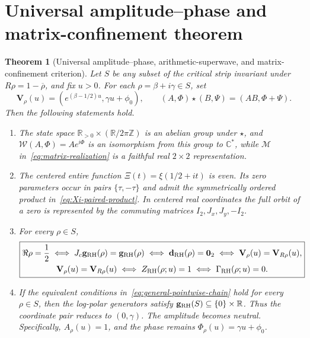 \documentclass[11pt]{article}
\newtheorem{theorem}[definition]{Theorem}
\newcommand{\vzero}{\mathbf 0}
\begin{document}
\section{Universal amplitude--phase and matrix-confinement theorem}
\begin{theorem}[Universal amplitude--phase, arithmetic-superwave, and matrix-confinement criterion]\label{thm:general-compass}
Let $S$ be any subset of the critical strip invariant under
$R\rho=1-\overline\rho$, and fix $u>0$.  For each $\rho=\beta+i\gamma\in S$, set
\begin{equation}
 \mathbf V_\rho(u)=\left(e^{(\beta-1/2)u},\gamma u+\phi_0\right),
 \qquad
 (A,\Phi)\star(B,\Psi)=(AB,\Phi+\Psi).
\end{equation}
Then the following statements hold.

\begin{enumerate}
 \item The state space
 $\mathbb R_{>0}\times(\mathbb R/2\pi\mathbb Z)$ is an abelian group under $\star$, and
 $\mathcal W(A,\Phi)=Ae^{i\Phi}$ is an isomorphism from this group to $\mathbb C^*$, while
 $\mathcal M$ in~\eqref{eq:matrix-realization} is a faithful real $2\times2$ representation.

 \item The centered entire function $\Xi(t)=\xi(1/2+it)$ is even.  Its zero parameters
 occur in pairs $\{\tau,-\tau\}$ and admit the symmetrically ordered product
 in~\eqref{eq:Xi-paired-product}.  In centered real coordinates the full orbit of a zero is
 represented by the commuting matrices $I_2,J_x,J_y,-I_2$.

 \item For every $\rho\in S$,
 \begin{equation}\label{eq:general-pointwise-chain}
 \boxed{\begin{gathered}
 \Re\rho=\frac12
 \iff J_c\mathbf g_{\rm RH}(\rho)=\mathbf g_{\rm RH}(\rho)
 \iff \mathbf d_{\rm RH}(\rho)=\vzero_2
 \iff \mathbf V_\rho(u)=\mathbf V_{R\rho}(u),\\
 \mathbf V_\rho(u)=\mathbf V_{R\rho}(u)
 \iff Z_{\rm RH}(\rho;u)=1
 \iff \Gamma_{\rm RH}(\rho;u)=0.
 \end{gathered}}
 \end{equation}

 \item If the equivalent conditions in~\eqref{eq:general-pointwise-chain} hold for every
 $\rho\in S$, then the log-polar generators satisfy
 $\mathbf g_{\rm RH}(S)\subseteq\{0\}\times\mathbb R$.  Thus the coordinate pair reduces
 to $(0,\gamma)$.  The amplitude becomes neutral.  Specifically, $A_\rho(u)=1$, and the
 phase remains $\Phi_\rho(u)=\gamma u+\phi_0$.


\end{enumerate}
\end{theorem}
\end{document}
